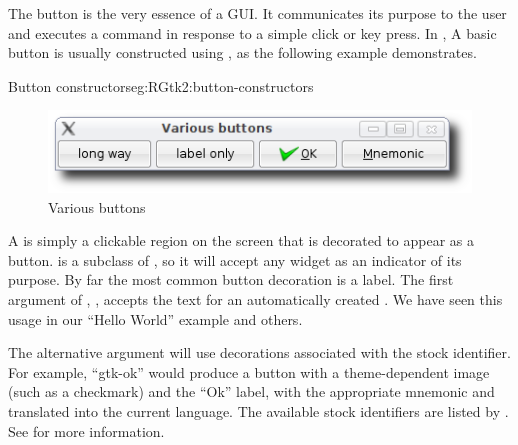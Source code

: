 The button is the very essence of a GUI. It communicates its purpose
to the user and executes a command in response to a simple click or
key press. In \GTK\/, A basic button is usually constructed using
, as the following example demonstrates.

\begin{example}{Button constructors}{eg:RGtk2:button-constructors}
\begin{Schunk}
\end{Schunk}
\end{example}

\begin{figure}
  \centering
  \includegraphics[width=.8\textwidth]{RGtk2-various-button}
  \caption{Various buttons}
  \label{fig:RGtk2:various-buttons}
\end{figure}

A  is simply a clickable region on the screen that is
decorated to appear as a button.  is a subclass of
, so it will accept any widget as an indicator of its
purpose. By far the most common button decoration is a label. The
first argument of ,
, accepts the text for an automatically
created . We have seen this usage in our ``Hello
World'' example and others.

The alternative  argument will use
decorations associated with the stock identifier. For example,
``gtk-ok'' would produce a button with a theme-dependent image (such
as a checkmark) and the ``Ok'' label, with the appropriate mnemonic
and translated into the current language.  The available stock
identifiers are listed by . See
 for more information.


